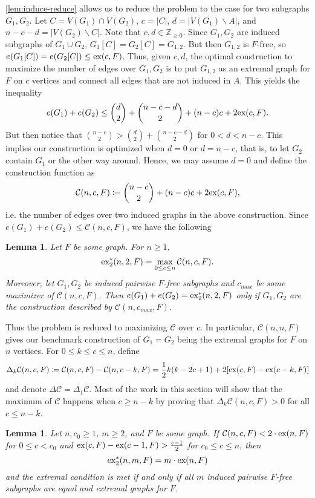 \documentclass[12pt]{report}
\newtheorem{lemma}[theorem]{Lemma}
\newcommand*{\Z}{\mathbb{Z}}
\newcommand*{\ex}{\textnormal{ex}}
\newcommand*{\dex}{\textnormal{ex}_2}
\newcommand*{\con}{\mathcal{C}}
\begin{document}
\cref{lem:induce-reduce} allows us to reduce the problem to the case for two subgraphs $G_1, G_2$. Let $C = V(G_1) \cap V(G_2)$, $c = |C|$, $d = |V(G_1) \backslash A|$, and $n - c - d = |V(G_2) \backslash C|$. Note that $c, d \in \Z_{\geq 0}$. Since $G_1, G_2$ are induced subgraphs of $G_1 \cup G_2$, $G_1[C] = G_2[C] = G_{1, 2}$. But then $G_{1, 2}$ is $F$-free, so $e(G_1[C]) = e(G_2[C]) \leq \ex(c, F)$. Thus, given $c, d$, the optimal construction to maximize the number of edges over $G_1, G_2$ is to put $G_{1, 2}$ as an extremal graph for $F$ on $c$ vertices and connect all edges that are not induced in $A$. This yields the inequality
\[
  e(G_1) + e(G_2) \leq \binom{d}{2} + \binom{n - c - d}{2} + (n - c)c + 2\ex(c, F).
\]
But then notice that $\binom{n - c}{2} > \binom{d}{2} + \binom{n - c - d}{2}$ for $0 < d < n - c$. This implies our construction is optimized when $d = 0$ or $d = n - c$, that is, to let $G_2$ contain $G_1$ or the other way around. Hence, we may assume $d = 0$ and define the construction function as
\[
  \con(n, c, F) \coloneq \binom{n - c}{2} + (n - c)c + 2\ex(c, F),
\]
i.e. the number of edges over two induced graphs in the above construction. Since $e(G_1) + e(G_2) \leq \con(n, c, F)$, we have the following
\begin{lemma}\label{lem:optimize-con}
  Let $F$ be some graph. For $n \geq 1$,
  \[
    \dex^*(n, 2, F) = \max_{0 \leq c \leq n} \con(n, c, F).
  \]
  Moreover, let $G_1, G_2$ be induced pairwise $F$-free subgraphs and $c_{max}$ be some maximizer of $\con(n, c, F)$. Then $e(G_1) + e(G_2) = \dex^*(n, 2, F)$ only if $G_1, G_2$ are the construction described by $\con(n, c_{max}, F)$.
\end{lemma}
Thus the problem is reduced to maximizing $\con$ over $c$. In particular, $\con(n, n, F)$ gives our benchmark construction of $G_1 = G_2$ being the extremal graphs for $F$ on $n$ vertices. For $0 \leq k \leq c \leq n$, define
\[
  \Delta_k \con(n, c, F) \coloneq \con(n, c, F) - \con(n, c - k, F) = \frac{1}{2}k(k - 2c + 1) + 2[\ex(c, F) - \ex(c - k, F)]
\]
and denote $\Delta \con = \Delta_1 \con$. Most of the work in this section will show that the maximum of $\con$ happens when $c \geq n - k$ by proving that $\Delta_k \con(n, c, F) > 0$ for all $c \leq n - k$.

\begin{lemma}\label{lem:induce-cond}
  Let $n, c_0 \geq 1$, $m \geq 2$, and $F$ be some graph. If $\con(n, c, F)< 2 \cdot \ex(n, F)$ for $0 \leq c < c_0$ and $\ex(c, F) - \ex(c - 1, F) > \frac{c - 1}{2}$ for $c_0 \leq c \leq n$, then
  \[
    \dex^*(n, m, F) = m \cdot \ex(n, F)
  \]
  and the extremal condition is met if and only if all $m$ induced pairwise $F$-free subgraphs are equal and extremal graphs for $F$.
\end{lemma}
\end{document}
